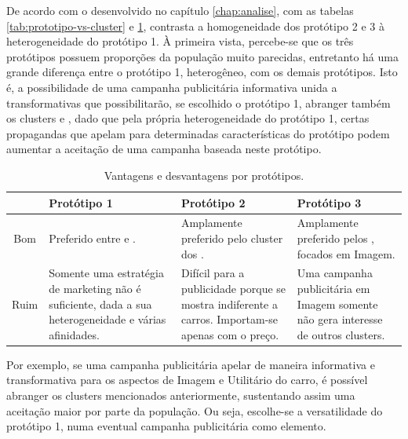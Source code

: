 De acordo com o desenvolvido no capítulo \ref{chap:analise}, com
as tabelas \ref{tab:prototipo-vs-cluster} e \ref{tab:prototipo-analise},
contrasta a homogeneidade dos protótipo 2 e 3 à heterogeneidade do
protótipo 1. À primeira vista, percebe-se que os três protótipos possuem
proporções da população muito parecidas, entretanto há uma grande
diferença entre o protótipo 1, heterogêneo, com os demais protótipos.
Isto é, a possibilidade de uma campanha publicitária informativa unida
a transformativas que possibilitarão, se escolhido o protótipo 1,
abranger também os clusters \nomeCc{} e \nomeCb{}, dado que pela
própria heterogeneidade do protótipo 1, certas propagandas que apelam
para determinadas características do protótipo podem aumentar a aceitação
de uma campanha baseada neste protótipo.

\begin{table}
\begin{centering}
\begin{tabular}{c|>{\centering}p{}|>{\centering}p{}|>{\centering}p{}}
\hline 
 & Protótipo 1 & Protótipo 2 & Protótipo 3\tabularnewline
\hline 
Bom & Preferido entre \nomeCa{} e \nomeCd{}. & Amplamente preferido pelo cluster dos \nomeCc{}. & Amplamente preferido pelos \nomeCb{}, focados em Imagem.\tabularnewline
\hline 
Ruim & Somente uma estratégia de marketing não é suficiente, dada a sua heterogeneidade
e várias afinidades. & Difícil para a publicidade porque se mostra indiferente a carros.
Importam-se apenas com o preço. & Uma campanha publicitária em Imagem somente não gera interesse de
outros clusters.\tabularnewline
\hline 
\end{tabular}
\par\end{centering}
\caption{\label{tab:prototipo-analise}Vantagens e desvantagens por protótipos.}
\end{table}


Por exemplo, se uma campanha publicitária apelar de maneira informativa
e transformativa para os aspectos de Imagem e Utilitário do carro,
é possível abranger os clusters mencionados anteriormente, sustentando
assim uma aceitação maior por parte da população. Ou seja, escolhe-se
a versatilidade do protótipo 1, numa eventual campanha publicitária
como elemento.

